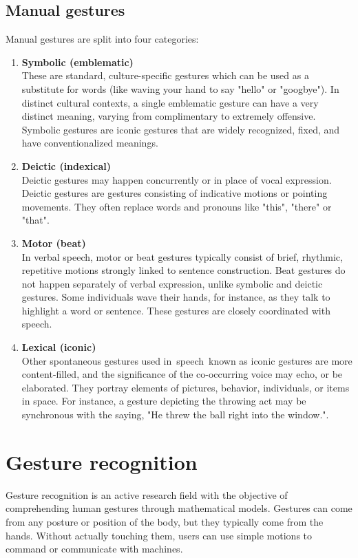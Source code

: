 \documentclass[12pt,a4paper,twoside]{report}
\begin{document}
\subsection{Manual gestures}
Manual gestures are split into four categories:

\begin{enumerate}
  \item \textbf{Symbolic (emblematic)} \\
    These are standard, culture-specific gestures which can be used as a substitute for words (like waving your hand to say "hello" or "googbye"). In distinct cultural contexts, a single emblematic gesture can have a very distinct meaning, varying from complimentary to extremely offensive.  Symbolic gestures are iconic gestures that are widely recognized, fixed, and have conventionalized meanings. \cite{Krauss}

  \item \textbf{Deictic (indexical)} \\
    Deictic gestures may happen concurrently or in place of vocal expression. Deictic gestures are gestures consisting of indicative motions or pointing movements. They often replace words and pronouns like "this", "there" or "that".

  \item \textbf{Motor (beat)} \\
    In verbal speech, motor or beat gestures typically consist of brief, rhythmic, repetitive motions strongly linked to sentence construction. Beat gestures do not happen separately of verbal expression, unlike symbolic and deictic gestures. Some individuals wave their hands, for instance, as they talk to highlight a word or sentence. These gestures are closely coordinated with speech.

  \item \textbf{Lexical (iconic)} \\
    Other spontaneous gestures used in speech known as iconic gestures are more content-filled, and the significance of the co-occurring voice may echo, or be elaborated. They portray elements of pictures, behavior, individuals, or items in space. For instance, a gesture depicting the throwing act may be synchronous with the saying, "He threw the ball right into the window.".
\end{enumerate}

\section{Gesture recognition}
Gesture recognition is an active research field with the objective of comprehending human gestures through mathematical models. Gestures can come from any posture or position of the body, but they typically come from the hands. Without actually touching them, users can use simple motions to command or communicate with machines.
\end{document}
